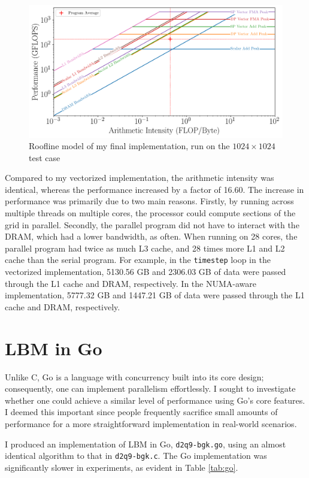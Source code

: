 \documentclass[twocolumn, a4paper]{article}
\begin{document}
\begin{figure}[htbp]
  \includegraphics[width=\linewidth]{roofline_numa.png}
  \caption{Roofline model of my final implementation, run on the $1024\times1024$ test case}\label{fig:roofline_numa}
\end{figure}

Compared to my vectorized implementation, the arithmetic intensity was identical, whereas the performance increased by a factor of 16.60.
The increase in performance was primarily due to two main reasons.
Firstly, by running across multiple threads on multiple cores, the processor could compute sections of the grid in parallel.
Secondly, the parallel program did not have to interact with the DRAM, which had a lower bandwidth, as often.
When running on 28 cores, the parallel program had twice as much L3 cache, and 28 times more L1 and L2 cache than the serial program.
For example, in the \texttt{timestep} loop in the vectorized implementation, 5130.56 GB and 2306.03 GB of data were passed through the L1 cache and DRAM, respectively.
In the NUMA-aware implementation, 5777.32 GB and 1447.21 GB of data were passed through the L1 cache and DRAM, respectively. 

\section{LBM in Go}

Unlike C, Go is a language with concurrency built into its core design; consequently, one can implement parallelism effortlessly.
I sought to investigate whether one could achieve a similar level of performance using Go's core features.
I deemed this important since people frequently sacrifice small amounts of performance for a more straightforward implementation in real-world scenarios.

I produced an implementation of LBM in Go, \texttt{d2q9-bgk.go}, using an almost identical algorithm to that in \texttt{d2q9-bgk.c}.
The Go implementation was significantly slower in experiments, as evident in Table \ref{tab:go}.
\end{document}

